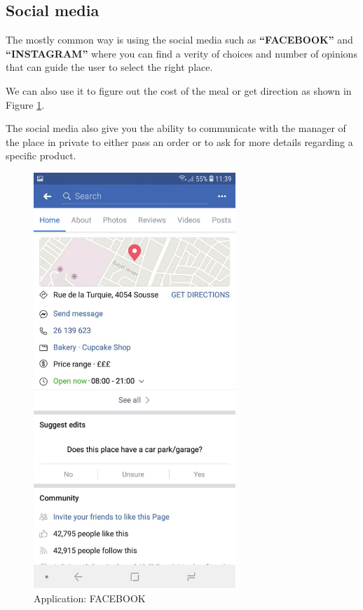 \documentclass[12pt,a4paper]{report}
\begin{document}
	\subsection{Social media}
	The mostly common way is using the social media such as \textbf{``FACEBOOK''} and \textbf{``INSTAGRAM''} where you can find a verity of choices and number of opinions that can guide the user to select the right place.\par We can also use it to figure out the cost of the meal or get direction as shown in Figure \ref{label-facebook}.
	\par The social media also give you the ability to communicate with the manager of the place in private to either pass an order or to ask for more details regarding a specific product.  \par
	\begin{figure}[H]
		\centering
		\includegraphics[width=3in,keepaspectratio]{facebook.jpg}
		\caption{Application: FACEBOOK\protect{}\protect\footnotemark[\thefootnote]}
		
		\label{label-facebook}
	\end{figure}
	\clearpage
\end{document}
